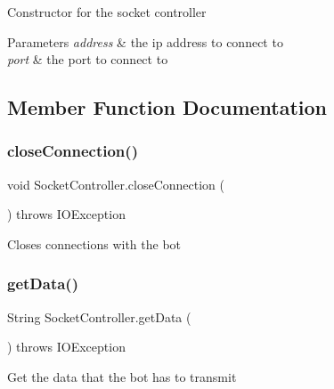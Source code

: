 Constructor for the socket controller 
\begin{DoxyParams}{Parameters}
{\em address} & the ip address to connect to \\
\hline
{\em port} & the port to connect to \\
\hline
\end{DoxyParams}


\subsection{Member Function Documentation}
\mbox{\label{class_socket_controller_ad7ce6469961880bd7564c54eac4f43ec}} 
\subsubsection{\texorpdfstring{close\+Connection()}{closeConnection()}}
{\footnotesize\ttfamily void Socket\+Controller.\+close\+Connection (\begin{DoxyParamCaption}{ }\end{DoxyParamCaption}) throws I\+O\+Exception\hspace{0.3cm}{\ttfamily [inline]}}

Closes connections with the bot \mbox{\label{class_socket_controller_a73e0c51679b713a6ff6a265b003e5794}} 
\subsubsection{\texorpdfstring{get\+Data()}{getData()}}
{\footnotesize\ttfamily String Socket\+Controller.\+get\+Data (\begin{DoxyParamCaption}{ }\end{DoxyParamCaption}) throws I\+O\+Exception\hspace{0.3cm}{\ttfamily [inline]}}

Get the data that the bot has to transmit \mbox{\label{class_socket_controller_a7de8ef4fc180b2ed9e32b0dea6eb88f3}} 

